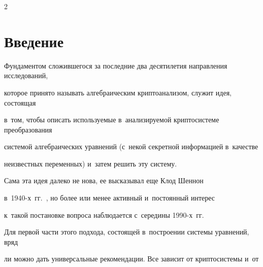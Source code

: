 

  


\vspace*{9pt}













\thispagestyle{headings}





\begin{multicols}{2}





\label{st\stat}








\section{Введение}





Фундаментом сложившегося за последние два десятилетия направления исследований, 


которое принято называть алгебраическим криптоанализом, служит идея, состоящая 


в~том, чтобы описать используемые в~анализируемой криптосистеме преобразования 


системой алгебраических уравнений (с~некой секретной информацией в~качестве 


неизвестных переменных) и~затем решить эту сис\-те\-му.


Сама эта идея далеко не нова, ее высказывал еще Клод Шеннон 


в~1940-х~гг.~\cite{Shannon1949}, но более или менее активный и~постоянный интерес 


к~такой постановке вопроса наблюдается с~середины 1990-х~гг.





Для первой части этого подхода, состоящей в~построении системы уравнений, вряд 


ли можно дать универсальные рекомендации. Все зависит от крип\-то\-сис\-те\-мы и~от 



\end{multicols}
